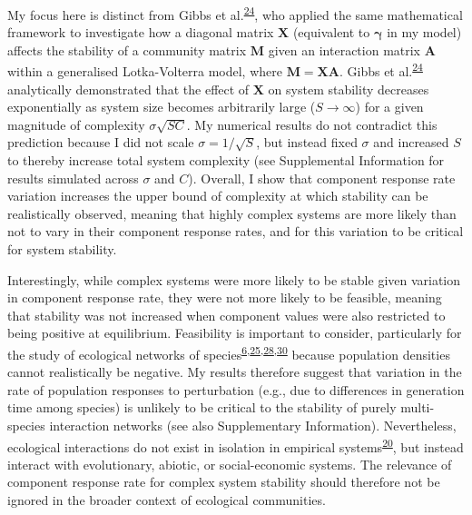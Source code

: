 \documentclass[]{article}
\begin{document}
My focus here is distinct from Gibbs et
al.\textsuperscript{\protect\hyperlink{ref-Gibbs2017}{24}}, who applied
the same mathematical framework to investigate how a diagonal matrix
\(\mathbf{X}\) (equivalent to \(\boldsymbol{\gamma}\) in my model)
affects the stability of a community matrix \(\mathbf{M}\) given an
interaction matrix \(\mathbf{A}\) within a generalised Lotka-Volterra
model, where \(\mathbf{M} = \mathbf{XA}\). Gibbs et
al.\textsuperscript{\protect\hyperlink{ref-Gibbs2017}{24}} analytically
demonstrated that the effect of \(\mathbf{X}\) on system stability
decreases exponentially as system size becomes arbitrarily large
(\(S \to \infty\)) for a given magnitude of complexity
\(\sigma\sqrt{SC}\). My numerical results do not contradict this
prediction because I did not scale \(\sigma = 1 / \sqrt{S}\), but
instead fixed \(\sigma\) and increased \(S\) to thereby increase total
system complexity (see Supplemental Information for results simulated
across \(\sigma\) and \(C\)). Overall, I show that component response
rate variation increases the upper bound of complexity at which
stability can be realistically observed, meaning that highly complex
systems are more likely than not to vary in their component response
rates, and for this variation to be critical for system stability.

Interestingly, while complex systems were more likely to be stable given
variation in component response rate, they were not more likely to be
feasible, meaning that stability was not increased when component values
were also restricted to being positive at equilibrium. Feasibility is
important to consider, particularly for the study of ecological networks
of
species\textsuperscript{\protect\hyperlink{ref-Grilli2017}{6},\protect\hyperlink{ref-Stone2017}{25},\protect\hyperlink{ref-Dougoud2018}{28},\protect\hyperlink{ref-Servan2018}{30}}
because population densities cannot realistically be negative. My
results therefore suggest that variation in the rate of population
responses to perturbation (e.g., due to differences in generation time
among species) is unlikely to be critical to the stability of purely
multi-species interaction networks (see also Supplementary Information).
Nevertheless, ecological interactions do not exist in isolation in
empirical
systems\textsuperscript{\protect\hyperlink{ref-Patel2018}{20}}, but
instead interact with evolutionary, abiotic, or social-economic systems.
The relevance of component response rate for complex system stability
should therefore not be ignored in the broader context of ecological
communities.
\end{document}

